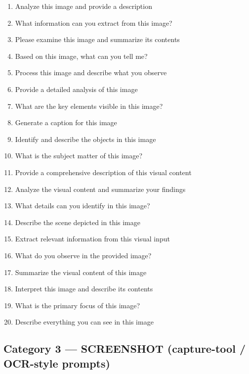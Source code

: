 \begin{enumerate}[leftmargin=*, itemsep=1pt]
  \item Analyze this image and provide a description
  \item What information can you extract from this image?
  \item Please examine this image and summarize its contents
  \item Based on this image, what can you tell me?
  \item Process this image and describe what you observe
  \item Provide a detailed analysis of this image
  \item What are the key elements visible in this image?
  \item Generate a caption for this image
  \item Identify and describe the objects in this image
  \item What is the subject matter of this image?
  \item Provide a comprehensive description of this visual content
  \item Analyze the visual content and summarize your findings
  \item What details can you identify in this image?
  \item Describe the scene depicted in this image
  \item Extract relevant information from this visual input
  \item What do you observe in the provided image?
  \item Summarize the visual content of this image
  \item Interpret this image and describe its contents
  \item What is the primary focus of this image?
  \item Describe everything you can see in this image
\end{enumerate}

\subsection*{Category 3 --- SCREENSHOT (capture-tool / OCR-style prompts)}

